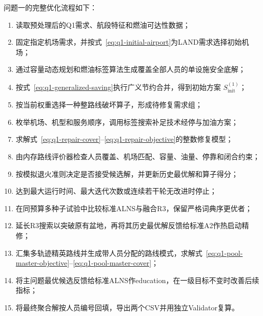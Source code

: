 \documentclass[UTF8,a4paper,zihao=5]{ctexart}
\begin{document}
\begin{table}[htbp]
  \centering
  \caption{问题一融合搜索的关键阶段}
  \label{tab:q1-alns-parameters}
\end{table}

问题一的完整优化流程如下：
\begin{enumerate}[label=\textbf{步骤\arabic*.},leftmargin=4.5em]
  \item 读取预处理后的Q1需求、航段特征和燃油可达性数据；
  \item 固定指定机场需求，并按式~\eqref{eq:q1-initial-airport}为LAND需求选择初始机场；
  \item 通过容量动态规划和燃油标签算法生成覆盖全部人员的单设施安全底解；
  \item 按式~\eqref{eq:q1-generalized-saving}执行广义节约合并，得到初始方案
  $S_{\mathrm{init}}^{(1)}$；
  \item 按当前权重选择一种整路线破坏算子，形成待修复需求组；
  \item 枚举机场、机型和服务顺序，调用标签搜索补足技术经停与加油方案；
  \item 求解式~\eqref{eq:q1-repair-cover}--\eqref{eq:q1-repair-objective}的整数修复模型；
  \item 由内存路线评价器检查人员覆盖、机场匹配、容量、油量、停靠和闭合约束；
  \item 按模拟退火准则决定是否接受候选解，并更新历史最优解和算子得分；
  \item 达到最大运行时间、最大迭代次数或连续若干轮无改进时停止；
  \item 在同预算多种子试验中比较标准ALNS与融合R3，保留严格词典序更优者；
  \item 延长R3搜索以突破原有盆地，再将其历史最优解反馈给标准A2作热启动精修；
  \item 汇集多轨迹精英路线并生成带人员分配的路线模式，求解式~\eqref{eq:q1-pool-master-objective}--\eqref{eq:q1-pool-master-cover}；
  \item 将主问题最优候选反馈给标准ALNS作education，在一级目标不变时改善后续指标；
  \item 将最终聚合解按人员编号回填，导出两个CSV并用独立Validator复算。
\end{enumerate}
\end{document}
